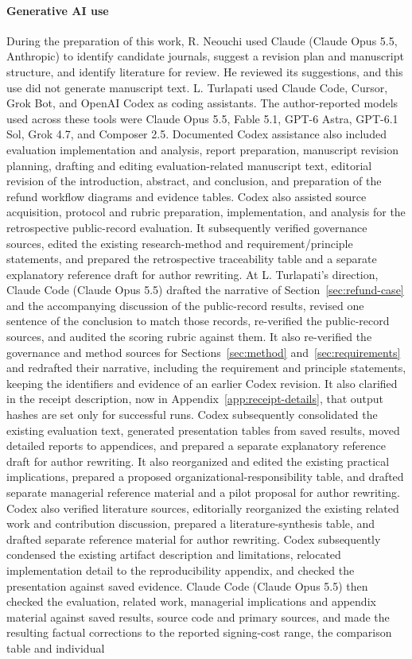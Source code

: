 \documentclass[11pt]{article}
\begin{document}
\paragraph{Generative AI use} During the preparation of this work, R. Neouchi used Claude (Claude Opus 5.5, Anthropic) to identify candidate journals, suggest a revision plan and manuscript structure, and identify literature for review. He reviewed its suggestions, and this use did not generate manuscript text. L. Turlapati used Claude Code, Cursor, Grok Bot, and OpenAI Codex as coding assistants. The author-reported models used across these tools were Claude Opus 5.5, Fable 5.1, GPT-6 Astra, GPT-6.1 Sol, Grok 4.7, and Composer 2.5. Documented Codex assistance also included evaluation implementation and analysis, report preparation, manuscript revision planning, drafting and editing evaluation-related manuscript text, editorial revision of the introduction, abstract, and conclusion, and preparation of the refund workflow diagrams and evidence tables. Codex also assisted source acquisition, protocol and rubric preparation, implementation, and analysis for the retrospective public-record evaluation. It subsequently verified governance sources, edited the existing research-method and requirement/principle statements, and prepared the retrospective traceability table and a separate explanatory reference draft for author rewriting. At L. Turlapati's direction, Claude Code (Claude Opus 5.5) drafted the narrative of Section~\ref{sec:refund-case} and the accompanying discussion of the public-record results, revised one sentence of the conclusion to match those records, re-verified the public-record sources, and audited the scoring rubric against them. It also re-verified the governance and method sources for Sections~\ref{sec:method} and~\ref{sec:requirements} and redrafted their narrative, including the requirement and principle statements, keeping the identifiers and evidence of an earlier Codex revision. It also clarified in the receipt description, now in Appendix~\ref{app:receipt-details}, that output hashes are set only for successful runs. Codex subsequently consolidated the existing evaluation text, generated presentation tables from saved results, moved detailed reports to appendices, and prepared a separate explanatory reference draft for author rewriting. It also reorganized and edited the existing practical implications, prepared a proposed organizational-responsibility table, and drafted separate managerial reference material and a pilot proposal for author rewriting. Codex also verified literature sources, editorially reorganized the existing related work and contribution discussion, prepared a literature-synthesis table, and drafted separate reference material for author rewriting. Codex subsequently condensed the existing artifact description and limitations, relocated implementation detail to the reproducibility appendix, and checked the presentation against saved evidence. Claude Code (Claude Opus 5.5) then checked the evaluation, related work, managerial implications and appendix material against saved results, source code and primary sources, and made the resulting factual corrections to the reported signing-cost range, the comparison table and individual 
\end{document}
